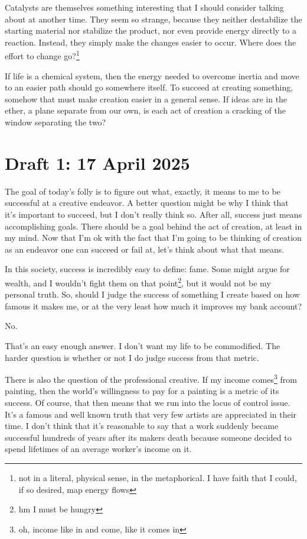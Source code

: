\documentclass[12pt]{article}
\renewcommand{\,}{\textsuperscript{,}}
\begin{document}
Catalysts are themselves something interesting that I should consider talking about at another time.  
They seem so strange, because they neither destabilize the starting material nor stabilize the product, nor even provide energy directly to a reaction.  
Instead, they simply make the changes easier to occur.  
Where does the effort to change go?\footnote{not in a literal, physical sense, in the metaphorical. I have faith that I could, if so desired, map energy flows}

If life is a chemical system, then the energy needed to overcome inertia and move to an easier path should go somewhere itself.  
To succeed at creating something, somehow that must make creation easier in a general sense.  
If ideas are in the ether, a plane separate from our own, is each act of creation a cracking of the window separating the two?

\section{Draft 1: 17 April 2025}

The goal of today's folly is to figure out what, exactly, it means to me to be successful at a creative endeavor.  
A better question might be why I think that it's important to succeed, but I don't really think so.  
After all, success just means accomplishing goals.  
There should be a goal behind the act of creation, at least in my mind.  
Now that I'm ok with the fact that I'm going to be thinking of creation as an endeavor one can succeed or fail at, let's think about what that means.

In this society, success is incredibly easy to define: fame.  
Some might argue for wealth, and I wouldn't fight them on that point\footnote{hm I must be hungry}, but it would not be my personal truth.  
So, should I judge the success of something I create based on how famous it makes me, or at the very least how much it improves my bank account?

No.

That's an easy enough answer.  
I don't want my life to be commodified.  
The harder question is whether or not I do judge success from that metric.

There is also the question of the professional creative.  
If my income comes\footnote{oh, income like in and come, like it comes in} from painting, then the world's willingness to pay for a painting is a metric of its success.  
Of course, that then means that we run into the locus of control issue.  
It's a famous and well known truth that very few artists are appreciated in their time.  
I don't think that it's reasonable to say that a work suddenly became successful hundreds of years after its makers death because someone decided to spend lifetimes of an average worker's income on it.
\end{document}
